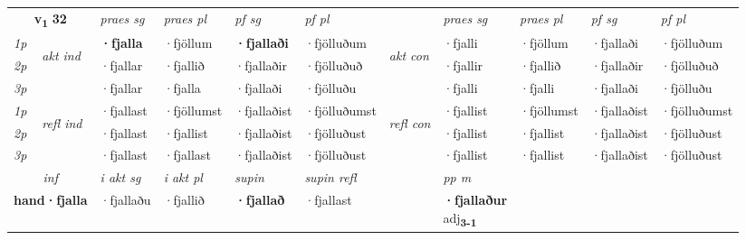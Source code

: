 \noindent
\begin{tabular}{lllllllllll} \toprule
\multicolumn{2}{c}{\textbf{v{\textsubscript{1}}} \Large{\textbf{32}}}  &  \textit{praes sg}  & \textit{praes pl}  &\textit{ pf sg} & \textit{pf pl} &  &  \textit{praes sg}  & \textit{praes pl}  & \textit{pf sg} & \textit{pf pl } \\*
	\cmidrule{3-6} \cmidrule{8-11}
 {\textit{1p}} & \multirow{3}{*}{\begin{turn}{90}\textit{akt ind}\end{turn}} & \textbf{·fjalla} & ·fjöllum & \textbf{·fjallaði} & ·fjölluðum & \multirow{3}{*}{\begin{turn}{90}\textit{akt con}\end{turn}} &·fjalli & ·fjöllum & ·fjallaði & ·fjölluðum\\*
 {\textit{2p}} &  &  ·fjallar  & ·fjallið & ·fjallaðir & ·fjölluðuð & & ·fjallir & ·fjallið & ·fjallaðir & ·fjölluðuð \\*
{\textit{3p}} &  & ·fjallar & ·fjalla & ·fjallaði & ·fjölluðu & & ·fjalli & ·fjalli& ·fjallaði & ·fjölluðu \\*
\cmidrule{3-6} \cmidrule{8-11}
 {\textit{1p}} & \multirow{3}{*}{\begin{turn}{90}\textit{refl ind}\end{turn}}  & ·fjallast & ·fjöllumst & ·fjallaðist & ·fjölluðumst & \multirow{3}{*}{\begin{turn}{90}\textit{refl con}\end{turn}}  &·fjallist & ·fjöllumst & ·fjallaðist & ·fjölluðumst \\*
 {\textit{2p}} &  & ·fjallast & ·fjallist & ·fjallaðist & ·fjölluðust & &·fjallist & ·fjallist & ·fjallaðist & ·fjölluðust \\*
 {\textit{3p}}  & & ·fjallast & ·fjallast & ·fjallaðist & ·fjölluðust & & ·fjallist & ·fjallist& ·fjallaðist & ·fjölluðust \\*
\cmidrule{3-6} \cmidrule{8-11}

   \multicolumn{2}{c}{\textit{inf}}  & \textit{i akt sg} & \textit{i akt pl}    & \textit{supin} & \textit{supin refl} && \textit{pp m} \\*
  \multicolumn{2}{c}{\textbf{hand\allowbreak ·fjalla}} & ·fjallaðu  & ·fjallið    &  \textbf{·fjallað} & ·fjallast && \specialcell{\textbf{·fjallaður} \\ adj\textbf{\textsubscript{3-1}}} \\*
\end{tabular}

